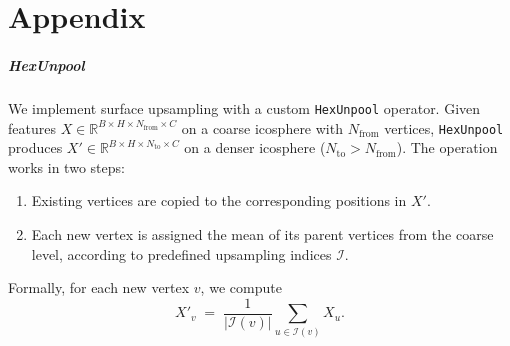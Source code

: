 \documentclass[FCD_GNN.tex]{subfiles}
\begin{document}
\chapter{Appendix}

\paragraph{HexUnpool} \label{sec:hexunpool}
We implement surface upsampling with a custom \texttt{HexUnpool} operator.
Given features $X \in \mathbb{R}^{B \times H \times N_{\text{from}} \times C}$ on a coarse icosphere
with $N_{\text{from}}$ vertices, \texttt{HexUnpool} produces
$X' \in \mathbb{R}^{B \times H \times N_{\text{to}} \times C}$ on a denser icosphere ($N_{\text{to}} > N_{\text{from}}$).
The operation works in two steps:
\begin{enumerate}
  \item Existing vertices are copied to the corresponding positions in $X'$.
  \item Each new vertex is assigned the mean of its parent vertices from the coarse level,
  according to predefined upsampling indices $\mathcal{I}$.
\end{enumerate}
Formally, for each new vertex $v$, we compute
\[
X'_v \;=\; \frac{1}{|\mathcal{I}(v)|} \sum_{u \in \mathcal{I}(v)} X_u.
\]
\end{document}
